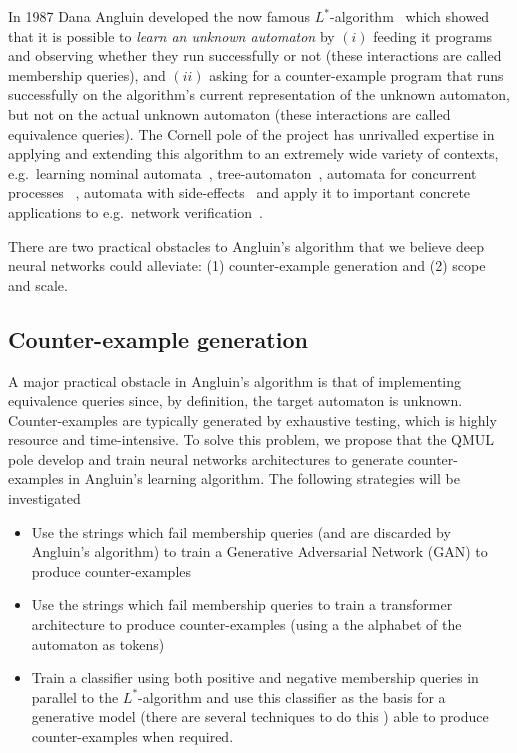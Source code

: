 \documentclass[11pt,a4paper]{article}
\begin{document}
	In 1987 Dana Angluin developed the now famous $L^\ast$-algorithm~\cite{angluin1987learning} which showed that it is possible to \emph{learn an unknown automaton} by $(i)$ feeding it programs and observing whether they run successfully or not (these interactions are called membership queries), and $(ii)$ asking for a counter-example program that runs successfully on the algorithm's current representation of the unknown automaton, but not on the actual unknown automaton (these interactions are called equivalence queries).  The Cornell pole of the project has unrivalled expertise in applying and extending this algorithm to an extremely wide variety of contexts, e.g.\ learning nominal automata~\cite{moerman2017learning}, tree-automaton~\cite{heerdt2022categorical}, automata for concurrent processes ~\cite{van2021learning}, automata with side-effects~\cite{van2020learning} and apply it to important concrete applications to e.g.\ network verification~\cite{ferreira2021prognosis}.
	  
	There are two practical obstacles to Angluin's algorithm that we believe deep neural networks could alleviate: (1) counter-example generation and (2) scope and scale.
	
	
		\subsection{Counter-example generation}
		A major practical obstacle in Angluin's algorithm is that of implementing equivalence queries since, by definition, the target automaton is unknown. Counter-examples are typically generated by exhaustive testing, which is highly resource and time-intensive. To solve this problem, we propose that the  QMUL pole develop and train neural networks architectures to generate counter-examples in Angluin's learning algorithm. The following strategies will be investigated
		\begin{itemize}
			\item Use the strings which fail membership queries (and are discarded by Angluin's algorithm) to train a Generative Adversarial Network (GAN) to produce counter-examples
			\item Use the strings which fail membership queries to train a transformer architecture to produce counter-examples (using a the alphabet of the automaton as tokens)
			\item Train a classifier using both positive and negative membership queries in parallel to the $L^\ast$-algorithm and use this classifier as the basis for a generative model (there are several techniques to do this \cite{?}) able to produce counter-examples when required.
		\end{itemize}
		
\end{document}
